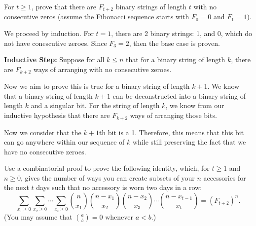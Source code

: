 \documentclass[11pt]{article}
\begin{document}
\begin{Parts}
\Part For $t\geq 1$, prove that there are $F_{t+2}$ binary strings of length $t$ with no consecutive zeros (assume the Fibonacci sequence starts with $F_0=0$ and $F_1=1$).

\begin{solution}
  We proceed by induction. For $t = 1$, there are 2 binary strings: 1, and 0, which do not have conescutive zeroes. Since $F_3 = 2$, then the base case is proven. 

  \textbf{Inductive Step: } Suppose for all $k \le n$ that for a binary string of length $k$, there are $F_{k+2}$ ways of arranging with no consecutive zeroes. 

  Now we aim to prove this is true for a binary string of length $k+1$. We know that a binary string of length $k+1$ can be deconstructed into a binary string of length $k$ and a singular bit. For the string of length $k$, we know from our inductive hypothesis that there are $F_{k+2}$ ways of arranging those bits.
  
  Now we consider that the $k+1$th bit is a 1. Therefore, this means that this bit can go anywhere within our sequence of $k$ while still preserving the fact that we have no consecutive zeroes. 
\end{solution}

\Part Use a combinatorial proof to prove the following identity, which, for $t\geq 1$ and $n\geq 0$, gives the number of ways you can create subsets of your $n$ accessories for the next $t$ days such that no accessory is worn two days in a row:
\[\sum_{x_1 \geq 0} \sum_{x_2\geq 0}\cdots \sum_{x_t \geq 0} {n \choose x_1}{n-x_1 \choose x_2}{n-x_2 \choose x_3}\cdots {n-x_{t-1}\choose x_t}= (F_{t+2})^n.\]
(You may assume that $\binom{a}{b} = 0$ whenever $a < b$.)

\end{Parts}
\end{document}
